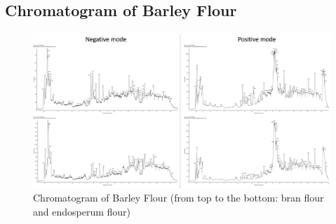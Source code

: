 \subsection{Chromatogram of Barley Flour}
\begin{figure}[h]
    \centering
    \includegraphics[scale=0.4]{images/chromatogram_barley_1.png}
    \caption{Chromatogram of Barley Flour (from top to the bottom: bran flour and endosperum flour)}
    \label{fig:chromatogram_barley}
\end{figure}

\clearpage
